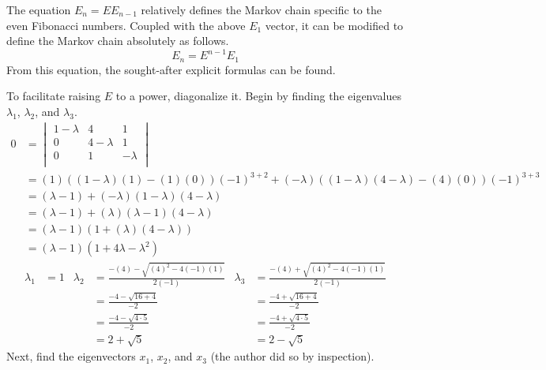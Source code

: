 \documentclass[titlepage]{article}
\begin{document}
The equation $E_n=EE_{n-1}$ relatively defines the Markov chain specific to the even Fibonacci numbers. Coupled with the above $E_1$ vector, it can be modified to define the Markov chain absolutely as follows.
\begin{equation*}
    E_n = E^{n-1}E_1
\end{equation*}
From this equation, the sought-after explicit formulas can be found.\par
To facilitate raising $E$ to a power, diagonalize it. Begin by finding the eigenvalues $\lambda_1$, $\lambda_2$, and $\lambda_3$.
\begin{align*}
    0 &=
    \begin{vmatrix}
        1-\lambda & 4 & 1\\
        0 & 4-\lambda & 1\\
        0 & 1 & -\lambda\\
    \end{vmatrix}\\
    &= (1)((1-\lambda)(1)-(1)(0))(-1)^{3+2}+(-\lambda)((1-\lambda)(4-\lambda)-(4)(0))(-1)^{3+3}\\
    &= (\lambda-1)+(-\lambda)(1-\lambda)(4-\lambda)\\
    &= (\lambda-1)+(\lambda)(\lambda-1)(4-\lambda)\\
    &= (\lambda-1)(1+(\lambda)(4-\lambda))\\
    &= (\lambda-1)(1+4\lambda-\lambda^2)
\end{align*}
\begin{align*}
    \lambda_1 &= 1&
        \lambda_2 &= \frac{-(4)-\sqrt{(4)^2-4(-1)(1)}}{2(-1)}&
            \lambda_3 &= \frac{-(4)+\sqrt{(4)^2-4(-1)(1)}}{2(-1)}\\
    &&
        &= \frac{-4-\sqrt{16+4}}{-2}&
            &= \frac{-4+\sqrt{16+4}}{-2}\\
    &&
        &= \frac{-4-\sqrt{4\cdot 5}}{-2}&
            &= \frac{-4+\sqrt{4\cdot 5}}{-2}\\
    &&
        &= 2+\sqrt{5}&
            &= 2-\sqrt{5}
\end{align*}
Next, find the eigenvectors $x_1$, $x_2$, and $x_3$ (the author did so by inspection).
\end{document}

